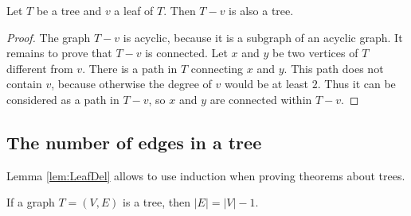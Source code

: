 \begin{page}
\setcounter{section}{2}
\setcounter{subsection}{2}
\setcounter{dfn}{6}
\label{portion:264}

\begin{lem}
\label{lem:LeafDel}
Let $T$ be a tree and $v$ a leaf of $T$.
Then $T - v$ is also a tree.
\end{lem}

\end{page}

\begin{page}
\setcounter{section}{2}
\setcounter{subsection}{3}
\setcounter{dfn}{6}
\label{portion:265}

\begin{proof}
The graph $T - v$ is acyclic, because it is a subgraph of an acyclic graph.
It remains to prove that $T - v$ is connected.
Let $x$ and $y$ be two vertices of $T$ different from $v$.
There is a path in $T$ connecting $x$ and $y$.
This path does not contain $v$, because otherwise the degree of $v$ would be at least $2$.
Thus it can be considered as a path in $T - v$, so $x$ and $y$ are connected within $T - v$.
\end{proof}



\end{page}

\begin{page}
\setcounter{section}{2}
\setcounter{subsection}{3}
\setcounter{dfn}{6}
\label{portion:267}

\subsection{The number of edges in a tree}
Lemma \ref{lem:LeafDel} allows to use induction when proving theorems about trees.


\end{page}

\begin{page}
\setcounter{section}{2}
\setcounter{subsection}{3}
\setcounter{dfn}{7}
\label{portion:269}

\begin{thm}
\label{thm:TreeEdges}
If a graph $T = (V, E)$ is a tree, then $|E| = |V| - 1$.
\end{thm}

\end{page}

